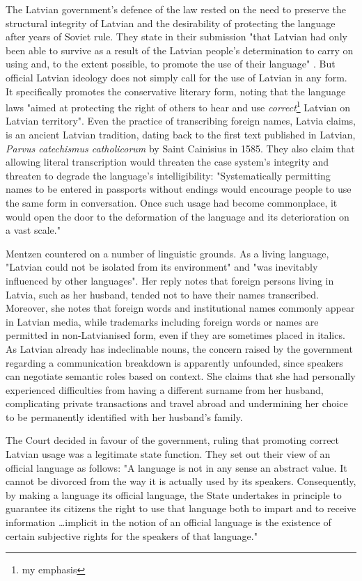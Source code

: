 The Latvian government's defence of the law rested on the need to preserve the
structural integrity of Latvian and the desirability of protecting the language
after years of Soviet rule. They state in their submission "that Latvian had
only been able to survive as a result of the Latvian people's determination to
carry on using and, to the extent possible, to promote the use of their
language" \parencite{mentzen04}. But official Latvian ideology does not simply
call for the use of Latvian in any form. It specifically promotes the
conservative literary form, noting that the language laws "aimed at protecting
the right of others to hear and use \textit{correct}\footnote{my emphasis}
Latvian on Latvian territory". Even the practice of transcribing foreign names,
Latvia claims, is an ancient Latvian tradition, dating back to the first text
published in Latvian, \textit{Parvus catechismus catholicorum} by Saint
Cainisius in 1585. They also claim that allowing literal transcription would
threaten the case system's integrity and threaten to degrade the language's
intelligibility: "Systematically permitting names to be entered in passports
without endings would encourage people to use the same form in conversation.
Once such usage had become commonplace, it would open the door to the
deformation of the language and its deterioration on a vast scale."

Mentzen countered on a number of linguistic grounds. As a living language,
"Latvian could not be isolated from its environment" and "was inevitably
influenced by other languages". Her reply notes that foreign persons living in
Latvia, such as her husband, tended not to have their names transcribed.
Moreover, she notes that foreign words and institutional names commonly appear
in Latvian media, while trademarks including foreign words or names are
permitted in non-Latvianised form, even if they are sometimes placed in
italics. As Latvian already has indeclinable nouns, the concern raised by the
government regarding a communication breakdown is apparently unfounded, since
speakers can negotiate semantic roles based on context. She claims that she had
personally experienced difficulties from having a different surname from her
husband, complicating private transactions and travel abroad and undermining
her choice to be permanently identified with her husband's family.

The Court decided in favour of the government, ruling that promoting correct
Latvian usage was a legitimate state function. They set out their view of an
official language as follows: "A language is not in any sense an abstract
value. It cannot be divorced from the way it is actually used by its speakers.
Consequently, by making a language its official language, the State undertakes
in principle to guarantee its citizens the right to use that language both to
impart and to receive information \dots implicit in the notion of an official
language is the existence of certain subjective rights for the speakers of that
language."

